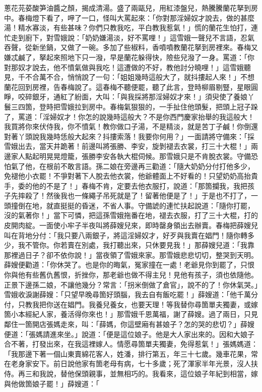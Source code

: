 \begin{showcontents}{}
蔥花芫荽酸笋油醬之顏，揭成清湯。盛了兩甌兒，用紅漆盤兒，熱騰騰蘭花拏到房中。春梅燈下看了，呷了一口，怪叫大罵起來：「你對那淫婦奴才說去，做的甚麼湯！精水寡淡，有些甚味？你們只教我吃，平白教我惹氣！」慌的蘭花生怕打，連忙走到廚下，對雪娥說：「奶奶嫌湯淡，好不罵哩！」這雪娥一聲兒不言語，忍氣吞聲，從新坐鍋，又做了一碗。多加了些椒料，香噴噴教蘭花拏到房裡來。春梅又嫌忒鹹了，拏起來照地下只一潑，早是蘭花躲得快，險些兒潑了一身。罵道：「你對那奴才說去，他不憤氣做與我吃！這遭做的不好，教他討分曉哩！」這雪娥聽見，千不合萬不合，悄悄說了一句：「姐姐幾時這般大了，就抖摟起人來！」不想蘭花回到房裡，告春梅說了。這春梅不聽便罷，聽了此言，登時柳眉剔豎，星眼圓睜，咬碎銀牙，通紅了紛面，大叫：「與我採將那淫婦奴才來！」須臾使了養娘丫鬟三四箇，登時把雪娥拉到房中。春梅氣狠狠的，一手扯住他頭髮，把頭上冠子跺了，罵道：「淫婦奴才！你怎的說幾時這般大？不是你西門慶家抬舉的我這般大！我買將你來伏侍我，你不憤氣！教你做口子湯，不是精淡，就是苦丁子鹹！你倒還對著丫頭說我幾時恁般大起來？抖摟索落！我要你何用？」一面請將守備來：「採雪娥出去，當天井跪著！前邊叫將張勝、李安，旋剝褪去衣裳，打三十大棍！」兩邊家人點起明晃晃燈籠，張勝李安各執大棍伺候。那雪娥只是不肯脫衣裳。守備恐怕氣了他，在根前不敢言語。孫二娘在旁邊再三勸道：「隨大奶奶分付打他多少，免褪他小衣罷！不爭對著下人脫去他衣裳，他爺體面上不好看的！只望奶奶高抬貴手，委的他的不是了！」春梅不肯，定要去他衣服打，說道：「那箇攔我，我把孩子先摔殺了！然後我也一條繩子吊死就是了！留著他便是了！」于是也不打了，一頭撞倒在地，就直挺挺的昏迷，不省人事。守備諕的連忙扶起說道：「隨你打罷，沒的氣著你！」當下可憐，把這孫雪娥拖番在地，褪去衣服，打了三十大棍，打的皮開肉綻。一面使小牢子半夜叫將薛嫂兒來，即時罄身領出去辦賣。春梅把薛嫂兒叫在背地分付：「我只要八兩銀子，將這淫婦奴才，好歹與我賣在娼門！隨你轉多少，我不管你。你若賣在別處，我打聽出來，只休要見我！」那薛嫂兒道：「我靠那裡過日子？卻不依你說！」當夜領了雪娥來家。那雪娥悲悲切切，整哭到天明。薛嫂便勸道：「你休哭了。也是你的晦氣，冤家撞在一處！老爺見你到罷了，只恨你與他有些舊仇舊恨，折挫你，那老爺也做不得主兒！見他有孩子，須也依隨他。正景下邊孫二娘，不讓他幾分？常言：「拐米倒做了倉官」，說不的了！你休氣哭。」雪娥收淚謝薛嫂：「只望早晚尋箇好頭腦，我去自有飯吃罷！」薛嫂道：「他千萬分付，只教我把你送在娼門。我養兒養女，也要天理！等我替你尋箇單夫獨妻，或嫁箇小本經紀人家，養活得你來也！」那雪娥千恩萬福，謝了薛嫂。過了兩日，只見鄰住一箇開店張媽走來，叫：「薛媽，你這壁廂有甚娘子？怎的哭的悲切？」薛嫂便道：「張媽請進來坐。」說道：「便是這位娘子。他是大人家出來的。因和大娘子合不著，打發出來，在我這裡嫁人。情愿尋箇單夫獨妻，免得惹氣！」張媽媽道：「我那邊下著一個山東賣綿花客人，姓潘，排行第五，年三十七歲。幾車花果，常在老身家安下。前日說他家有箇老母有病，七十多歲；死了渾家半年光景，沒人扶侍。再三和我說，替他保頭親事，並無相巧的。我看來，這位娘子年紀到相當，嫁與他做箇娘子罷！」薛嫂道：「
\end{showcontents}
